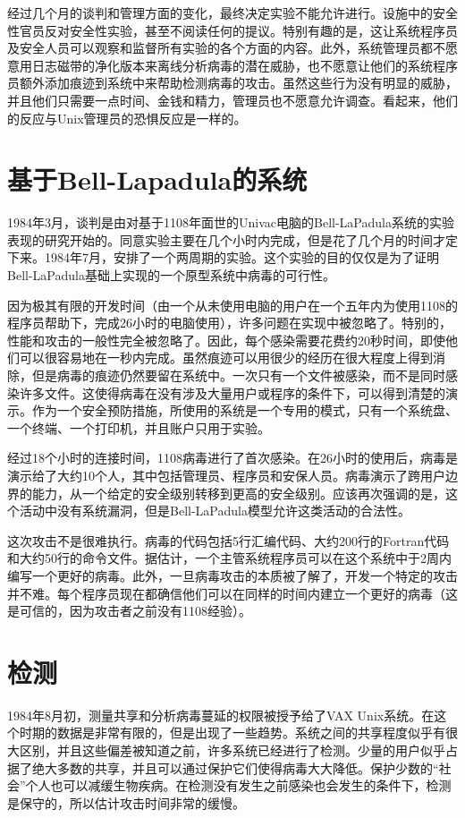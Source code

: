 经过几个月的谈判和管理方面的变化，最终决定实验不能允许进行。设施中的安全性官员反对安全性实验，甚至不阅读任何的提议。特别有趣的是，这让系统程序员及安全人员可以观察和监督所有实验的各个方面的内容。此外，系统管理员都不愿意用日志磁带的净化版本来离线分析病毒的潜在威胁，也不愿意让他们的系统程序员额外添加痕迹到系统中来帮助检测病毒的攻击。虽然这些行为没有明显的威胁，并且他们只需要一点时间、金钱和精力，管理员也不愿意允许调查。看起来，他们的反应与Unix管理员的恐惧反应是一样的。


\section{基于Bell-Lapadula的系统}

1984年3月，谈判是由对基于1108年面世的Univac电脑的Bell-LaPadula系统的实验表现的研究开始的。同意实验主要在几个小时内完成，但是花了几个月的时间才定下来。1984年7月，安排了一个两周期的实验。这个实验的目的仅仅是为了证明Bell-LaPadula基础上实现的一个原型系统中病毒的可行性。

因为极其有限的开发时间（由一个从未使用电脑的用户在一个五年内为使用1108的程序员帮助下，完成26小时的电脑使用），许多问题在实现中被忽略了。特别的，性能和攻击的一般性完全被忽略了。因此，每个感染需要花费约20秒时间，即使他们可以很容易地在一秒内完成。虽然痕迹可以用很少的经历在很大程度上得到消除，但是病毒的痕迹仍然要留在系统中。一次只有一个文件被感染，而不是同时感染许多文件。这使得病毒在没有涉及大量用户或程序的条件下，可以得到清楚的演示。作为一个安全预防措施，所使用的系统是一个专用的模式，只有一个系统盘、一个终端、一个打印机，并且账户只用于实验。


经过18个小时的连接时间，1108病毒进行了首次感染。在26小时的使用后，病毒是演示给了大约10个人，其中包括管理员、程序员和安保人员。病毒演示了跨用户边界的能力，从一个给定的安全级别转移到更高的安全级别。应该再次强调的是，这个活动中没有系统漏洞，但是Bell-LaPadula模型允许这类活动的合法性。


这次攻击不是很难执行。病毒的代码包括5行汇编代码、大约200行的Fortran代码和大约50行的命令文件。据估计，一个主管系统程序员可以在这个系统中于2周内编写一个更好的病毒。此外，一旦病毒攻击的本质被了解了，开发一个特定的攻击并不难。每个程序员现在都确信他们可以在同样的时间内建立一个更好的病毒（这是可信的，因为攻击者之前没有1108经验）。

\section{检测}

1984年8月初，测量共享和分析病毒蔓延的权限被授予给了VAX Unix系统。在这个时期的数据是非常有限的，但是出现了一些趋势。系统之间的共享程度似乎有很大区别，并且这些偏差被知道之前，许多系统已经进行了检测。少量的用户似乎占据了绝大多数的共享，并且可以通过保护它们使得病毒大大降低。保护少数的“社会”个人也可以减缓生物疾病。在检测没有发生之前感染也会发生的条件下，检测是保守的，所以估计攻击时间非常的缓慢。


